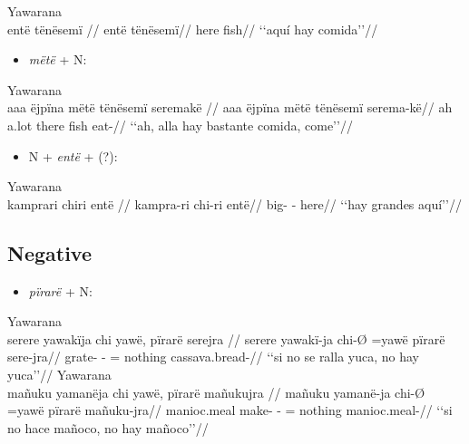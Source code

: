 \documentclass{memoir}
\begin{document}
\ex Yawarana \\
\label{histgrme-86}    \begingl
    \glpreamble entë tënësemï //
    \gla entë tënësemï//
    \glb here fish//
        \glft ‘‘aquí hay comida’’//  
    \endgl 
\xe

\begin{itemize}
\tightlist
\item
  \emph{mëtë} + N:
\end{itemize}

\ex Yawarana \\
\label{histgrme-89}    \begingl
    \glpreamble aaa ëjpïna mëtë tënësemï seremakë //
    \gla aaa ëjpïna mëtë tënësemï serema-kë//
    \glb ah a.lot there fish eat-//
        \glft ‘‘ah, alla hay bastante comida, come’’//  
    \endgl 
\xe

\begin{itemize}
\tightlist
\item
  N + \emph{entë} +  (?):
\end{itemize}

\ex Yawarana \\
\label{ctovarmafl-453}    \begingl
    \glpreamble kamprari chiri entë //
    \gla kampra-ri chi-ri entë//
    \glb big- - here//
        \glft ‘‘hay grandes aquí’’//  
    \endgl 
\xe

\subsection{Negative}

\begin{itemize}
\tightlist
\item
  \emph{pïrarë} + N:
\end{itemize}

\pex\label{}    \a Yawarana\\
    \label{desccasmaj-64}        \begingl
        \glpreamble serere yawakïja chi yawë, pïrarë serejra //
        \gla serere yawakï-ja chi-Ø =yawë pïrarë sere-jra//
        \glb  grate- - = nothing cassava.bread-//
            \glft ‘‘si no se ralla yuca, no hay yuca’’//  
        \endgl 
    \a Yawarana\\
    \label{desccasmaj-65}        \begingl
        \glpreamble mañuku yamanëja chi yawë, pïrarë mañukujra //
        \gla mañuku yamanë-ja chi-Ø =yawë pïrarë mañuku-jra//
        \glb manioc.meal make- - = nothing manioc.meal-//
            \glft ‘‘si no hace mañoco, no hay mañoco’’//  
        \endgl 
\xe
\end{document}
